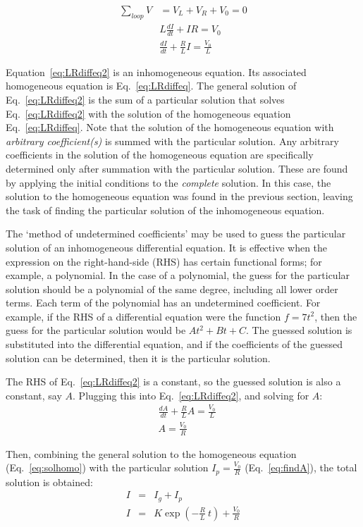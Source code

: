 \documentclass[12pt]{article}
\begin{document}
\begin{flushleft}
\begin{eqnarray}
\sum_{loop} V & = V_{L} + V_{R} +V_{0}  = 0  \nonumber \\
& L\frac{dI}{dt} +IR = V_{0} \nonumber \\
& \frac{dI}{dt} +\frac{R}{L}I = \frac{V_{0}}{L} 
\label{eq:LRdiffeq2}
\end{eqnarray}

Equation~\ref{eq:LRdiffeq2} is an inhomogeneous equation.  Its associated homogeneous equation is Eq.~\ref{eq:LRdiffeq}.  The general solution of Eq.~\ref{eq:LRdiffeq2} is the sum of a particular solution that solves Eq.~\ref{eq:LRdiffeq2} with the solution of the homogeneous equation Eq.~\ref{eq:LRdiffeq}.  Note that the solution of the homogeneous equation with {\it arbitrary coefficient(s)} is summed with the particular solution.  Any arbitrary coefficients in the solution of the homogeneous equation are specifically determined only after summation with the particular solution.  These are found by applying the initial conditions to the {\it complete} solution.  In this case, the solution to the homogeneous equation was found in the previous section, leaving the task of finding the particular solution of the inhomogeneous equation.  

The `method of undetermined coefficients' may be used to guess the particular solution of an inhomogeneous differential equation.  It is effective when the expression on the right-hand-side (RHS) has certain functional forms; for example, a polynomial.  In the case of a polynomial, the guess for the particular solution should be a polynomial of the same degree, including all lower order terms.  Each term of the polynomial has an undetermined coefficient.  For example, if the RHS of a differential equation were the function $f=7t^{2}$, then the guess for the particular solution would be $At^{2}+Bt+C$.  The guessed solution is substituted into the differential equation, and if the coefficients of the guessed solution can be determined, then it is the particular solution.

The RHS of Eq.~\ref{eq:LRdiffeq2} is a constant, so the guessed solution is also a constant, say $A$.  Plugging this into  Eq.~\ref{eq:LRdiffeq2}, and solving for $A$:
\begin{eqnarray}
& \frac{dA}{dt} +\frac{R}{L}A = \frac{V_{0}}{L} \nonumber \\
& A = \frac{V_{0}}{R}
\label{eq:findA}
\end{eqnarray}

Then, combining the general solution to the homogeneous equation (Eq.~\ref{eq:solhomo}) with the particular solution $I_{p}=\frac{V_{0}}{R}$ (Eq.~\ref{eq:findA}), the total solution is obtained:
\begin{eqnarray} 
I & = & I_{g} + I_{p}  \nonumber \\
I & = & K\exp{ \left(-\frac{R}{L}\:t \right) } + \frac{V_{0}}{R}
\label{eq:nokyet}
\end{eqnarray}


\end{flushleft}
\end{document}
